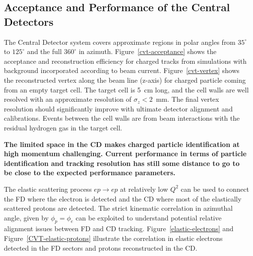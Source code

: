 \documentclass[final,3p,twocolumn]{elsarticle}
\begin{document}
\subsection{Acceptance and Performance of the Central Detectors} 

The Central Detector system covers approximate regions in polar angles from $35^\circ$ to $125^\circ$ and the
full $360^\circ$ in azimuth.  Figure~\ref{cvt-acceptance} shows the acceptance and reconstruction efficiency for
charged tracks from simulations with background incorporated according to beam current. Figure~\ref{cvt-vertex} 
shows the reconstructed vertex along the beam line (z-axis) for charged particle coming from an empty 
target cell. The target cell is 5~cm long, and the cell walls are well resolved with an approximate resolution 
of $\sigma_z<2$~mm. The final vertex resolution should significantly improve with ultimate detector alignment and 
calibrations. Events between the cell walls are from beam interactions with the residual hydrogen gas in the target cell.  

{\bf The limited space in the CD makes charged particle identification at high
momentum challenging. Current performance in terms of particle identification and tracking resolution has still some
distance to go to be close to the expected performance parameters.   }



The elastic scattering process $ep \to ep$ at relatively low $Q^2$ can be used to connect the FD where the electron is detected  
and the CD where most of the elastically scattered protons are detected. The strict kinematic correlation in azimuthal angle, given
by  $\phi_p = \phi_e$  can be exploited to understand potential relative alignment issues between FD and CD tracking. Figure~\ref{elastic-electrons} and Figure~\ref{CVT-elastic-protons} illustrate the correlation in elastic electrons detected in the FD sectors 
and protons reconstructed in the CD. 


 
\end{document}

